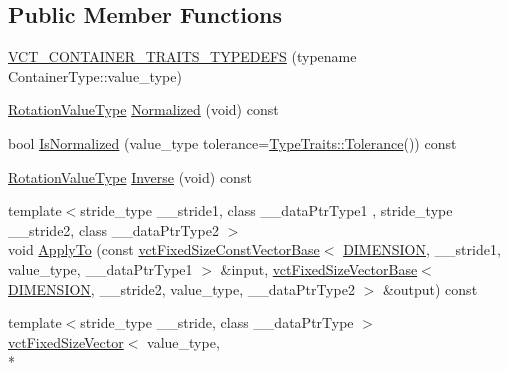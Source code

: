 \subsection*{Public Member Functions}
\begin{DoxyCompactItemize}
\item 
\hyperlink{classvct_matrix_rotation3_const_base_a8a5964653bd5a2d8e5b7577acbd973ff}{V\-C\-T\-\_\-\-C\-O\-N\-T\-A\-I\-N\-E\-R\-\_\-\-T\-R\-A\-I\-T\-S\-\_\-\-T\-Y\-P\-E\-D\-E\-F\-S} (typename Container\-Type\-::value\-\_\-type)
\item 
\hyperlink{classvct_matrix_rotation3_const_base_a913ecee79856db867ac6d45d27cfe362}{Rotation\-Value\-Type} \hyperlink{classvct_matrix_rotation3_const_base_ae3f3d95e7d9cd505300b230094b29318}{Normalized} (void) const 
\item 
bool \hyperlink{classvct_matrix_rotation3_const_base_a629632e3539b899f3b4d7d9e4f662e1c}{Is\-Normalized} (value\-\_\-type tolerance=\hyperlink{classcmn_type_traits_adc129bf9867295b90d300768b780fa99}{Type\-Traits\-::\-Tolerance}()) const 
\item 
\hyperlink{classvct_matrix_rotation3_const_base_a913ecee79856db867ac6d45d27cfe362}{Rotation\-Value\-Type} \hyperlink{classvct_matrix_rotation3_const_base_aef160dbf59345611986482d9b9e192eb}{Inverse} (void) const 
\item 
{\footnotesize template$<$stride\-\_\-type \-\_\-\-\_\-stride1, class \-\_\-\-\_\-data\-Ptr\-Type1 , stride\-\_\-type \-\_\-\-\_\-stride2, class \-\_\-\-\_\-data\-Ptr\-Type2 $>$ }\\void \hyperlink{classvct_matrix_rotation3_const_base_a832251356c47c892cfaf45846f8dd13d}{Apply\-To} (const \hyperlink{classvct_fixed_size_const_vector_base}{vct\-Fixed\-Size\-Const\-Vector\-Base}$<$ \hyperlink{classvct_matrix_rotation3_const_base_a6bc9712dde55ee3fca0d7880feb6a903afdf02f4ad230d81f0ca2539c7feb61f3}{D\-I\-M\-E\-N\-S\-I\-O\-N}, \-\_\-\-\_\-stride1, value\-\_\-type, \-\_\-\-\_\-data\-Ptr\-Type1 $>$ \&input, \hyperlink{classvct_fixed_size_vector_base}{vct\-Fixed\-Size\-Vector\-Base}$<$ \hyperlink{classvct_matrix_rotation3_const_base_a6bc9712dde55ee3fca0d7880feb6a903afdf02f4ad230d81f0ca2539c7feb61f3}{D\-I\-M\-E\-N\-S\-I\-O\-N}, \-\_\-\-\_\-stride2, value\-\_\-type, \-\_\-\-\_\-data\-Ptr\-Type2 $>$ \&output) const 
\item 
{\footnotesize template$<$stride\-\_\-type \-\_\-\-\_\-stride, class \-\_\-\-\_\-data\-Ptr\-Type $>$ }\\\hyperlink{classvct_fixed_size_vector}{vct\-Fixed\-Size\-Vector}$<$ value\-\_\-type, \\*

\end{DoxyCompactItemize}
